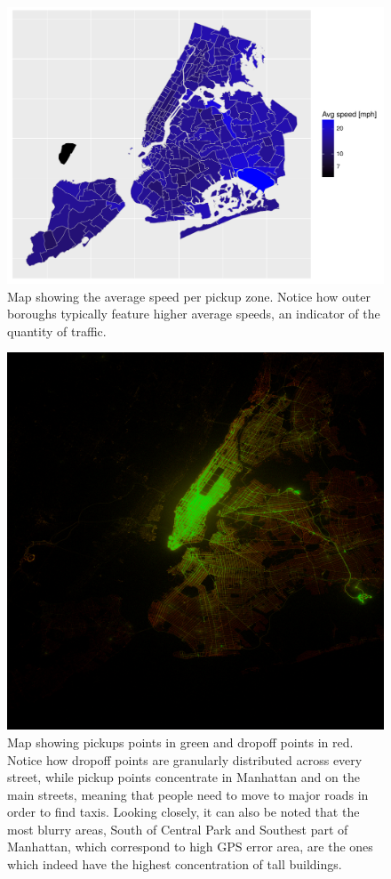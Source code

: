 \documentclass{acm_proc_article-sp-sigmod09}
\begin{document}
\begin{figure}
	\centering
	\includegraphics[width=1\columnwidth]{resources/base_plots/avg_speed_by_pickup_location_map.pdf}
	\caption{Map showing the average speed per pickup zone. Notice how outer boroughs typically feature higher average speeds, an indicator of the quantity of traffic.}
	\label{fig:speedMap}
\end{figure}

\begin{figure}
	\centering
	\includegraphics[width=1\columnwidth]{resources/base_plots/pickup_vs_dropoff.png}
	\caption{Map showing pickups points in green and dropoff points in red. Notice how dropoff points are granularly distributed across every street, while pickup points concentrate in Manhattan and on the main streets, meaning that people need to move to major roads in order to find taxis. Looking closely, it can also be noted that the most blurry areas, South of Central Park and Southest part of Manhattan, which correspond to high GPS error area, are the ones which indeed have the highest concentration of tall buildings.}
	\label{fig:pickupDropoffImageMap}
\end{figure}
\end{document}
